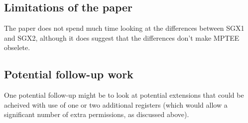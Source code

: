 \documentclass[11pt]{article}
\begin{document}
\subsection*{Limitations of the paper}

The paper does not spend much time looking at the differences between SGX1 and SGX2, although it does suggest that the differences don't make MPTEE obselete.

\subsection*{Potential follow-up work}

One potential follow-up might be to look at potential extensions that could be acheived with use of one or two additional registers (which would allow a significant number of extra permissions, as discussed above).
\end{document}
